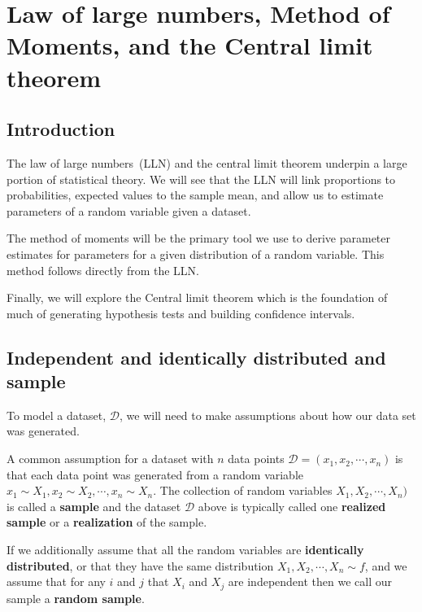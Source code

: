 \chapter{Law of large numbers, Method of Moments, and the Central limit theorem}
\hspace{1mm}

\section{Introduction}\label{intro}

The law of large numbers~(LLN) and the central limit theorem underpin a large portion of statistical theory. 
We will see that the LLN will link proportions to probabilities, expected values to the sample mean, and allow us to estimate parameters of a random variable given a dataset.

The method of moments will be the primary tool we use to derive parameter estimates for parameters for a given distribution of a random variable. This method follows directly from the LLN.

Finally, we will explore the Central limit theorem which is the foundation of much of  generating hypothesis tests and building confidence intervals. 

\section{Independent and identically distributed and sample}

To model a dataset, $\mathcal{D}$, we will need to make assumptions about how our data set was generated.

A common assumption for a dataset with $n$ data points $\mathcal{D} = (x_{1}, x_{2}, \cdots, x_{n} )$ is that each data point was generated from a random variable $x_{1} \sim X_{1}, x_{2} \sim X_{2}, \cdots, x_{n} \sim X_{n}$. 
The collection of random variables $X_{1},X_{2},\cdots, X_{n})$ is called a \textbf{sample} and the dataset $\mathcal{D}$ above is typically called one \textbf{realized sample} or a \textbf{realization} of the sample.

If we additionally assume that all the random variables are \textbf{identically distributed}, or that they have the same distribution $X_{1},X_{2}, \cdots, X_{n} \sim f$, and we assume that for any $i$ and $j$ that $X_{i}$ and $X_{j}$ are independent then we call our sample a \textbf{random sample}.

